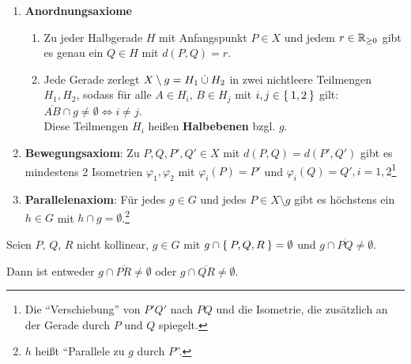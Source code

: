 \begin{definition}%
    \begin{enumerate}[label=§\arabic*),ref=§\arabic*,start=3]
        \item \label{axiom:3}\textbf{Anordnungsaxiome}
            \begin{enumerate}[label=(\roman*),ref=\theenumi{} (\roman*)]
                \item \label{axiom:3.1} Zu jeder 
                      Halbgerade $H$ mit Anfangspunkt $P \in X$ und jedem 
                      $r \in \mathbb{R}_{\geq 0}$ gibt es genau ein 
                      $Q \in H$ mit $d(P,Q) = r$.
                \item \label{axiom:3.2} Jede Gerade zerlegt 
                      $X \setminus g = H_1 \mathbin{\dot{\cup}} H_2$ in zwei 
                      nichtleere Teilmengen $H_1, H_2$,
                      sodass für alle $A \in H_i$, $B \in H_j$ mit
                      $i,j \in \Set{1,2}$ gilt: 
                      $\overline{AB} \cap g \neq \emptyset \Leftrightarrow i \neq j$.\\
                      Diese Teilmengen $H_i$ heißen 
                      \textbf{Halbebenen} bzgl. 
                      $g$.
            \end{enumerate}
        \item \label{axiom:4}\textbf{Bewegungsaxiom}: Zu $P, Q, P', Q' \in X$
            mit $d(P,Q) = d(P', Q')$ gibt es mindestens 2 Isometrien $\varphi_1, \varphi_2$
            mit $\varphi_i (P) = P'$ und $\varphi_i(Q) = Q', i=1,2$\footnote{Die \enquote{Verschiebung} von $P'Q'$ nach $PQ$ und die Isometrie, die zusätzlich an der Gerade durch $P$ und $Q$ spiegelt.}
        \item \label{axiom:5}\textbf{Parallelenaxiom}: Für jedes $g \in G$ und jedes
            $P \in X \setminus g$ gibt es höchstens ein $h \in G$ mit
            $h \cap g = \emptyset$.\footnote{$h$ heißt \enquote{Parallele zu $g$ durch $P$}.}
    \end{enumerate}
\end{definition}

\begin{satz}\label{satz:pasch} %
    Seien $P$, $Q$, $R$ nicht kollinear, $g \in G$ mit $g \cap \Set{P, Q, R} = \emptyset$
    und $g \cap \overline{PQ} \neq \emptyset$. 

    Dann ist entweder $g \cap \overline{PR} \neq \emptyset$ oder 
                      $g \cap \overline{QR} \neq \emptyset$.
\end{satz}

